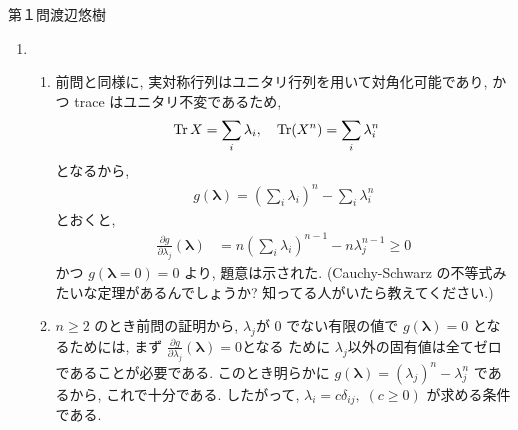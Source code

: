 \begin{answer}{第１問}{渡辺悠樹}
\begin{enumerate}
\item
  \begin{enumerate}
  \item
    前問と同様に, 実対称行列はユニタリ行列を用いて対角化可能であり, かつ trace はユニタリ不変であるため, 
    \begin{align*}
      \mathop{\mathrm{Tr}} X &= \sum_i \lambda_i, \quad \mathop{\mathrm{Tr}}(X^n)=\sum_i\lambda_i^n
    \end{align*}
    となるから, 
    \begin{align*}
      g(\bm{\lambda}) = \left(\sum_i \lambda_i \right)^n - \sum_i \lambda_i^n
    \end{align*}
    とおくと, 
    \begin{align*}
      \frac{\partial g}{\partial \lambda_j}(\bm{\lambda})
      &= n\left(\sum_i \lambda_i\right)^{n-1} -n\lambda_j^{n-1} \ge 0
    \end{align*}
    かつ $g(\bm{\lambda}=0) = 0$ より, 題意は示された. (Cauchy-Schwarz の不等式みたいな定理があるんでしょうか?
    知ってる人がいたら教えてください.)
  \item
    $n\ge2$ のとき前問の証明から, $\lambda_j$が 0 でない有限の値で $g(\bm{\lambda})=0$ となるためには, まず
    $\frac{\partial g}{\partial \lambda_j} (\bm{\lambda})= 0$となる
    ために $\lambda_j$以外の固有値は全てゼロであることが必要である. このとき明らかに
    $g(\bm{\lambda}) = (\lambda_j)^n -\lambda_j^n$ であるから, これで十分である.
    したがって, $\lambda_i= c\delta_{ij}, \; (c\ge0)$
    が求める条件である.
  \end{enumerate}
\end{enumerate}
\end{answer}

